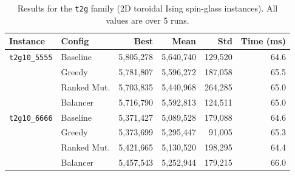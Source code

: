 \documentclass[12pt]{article}
\begin{document}
\begin{table}[H]
\centering
\begin{tabular}{|l|l|r|r|r|r|}
\toprule
\textbf{Instance} & \textbf{Config} & \textbf{Best} & \textbf{Mean} & \textbf{Std} & \textbf{Time (ms)} \\
\midrule
\texttt{t2g10\_5555} & \cellcolor{clrBaseline!25}Baseline  & \cellcolor{clrBaseline!25}5{,}805{,}278 & \cellcolor{clrBaseline!25}5{,}640{,}740 & \cellcolor{clrBaseline!25}129{,}520 & \cellcolor{clrBaseline!25}64.6 \\
                     & \cellcolor{clrGreedy!25}Greedy      & \cellcolor{clrGreedy!25}5{,}781{,}807   & \cellcolor{clrGreedy!25}5{,}596{,}272   & \cellcolor{clrGreedy!25}187{,}058   & \cellcolor{clrGreedy!25}65.5  \\
                     & \cellcolor{clrRanked!25}Ranked Mut. & \cellcolor{clrRanked!25}5{,}703{,}835   & \cellcolor{clrRanked!25}5{,}440{,}968   & \cellcolor{clrRanked!25}264{,}285   & \cellcolor{clrRanked!25}65.0  \\
                     & \cellcolor{clrBalancer!25}Balancer  & \cellcolor{clrBalancer!25}5{,}716{,}790 & \cellcolor{clrBalancer!25}5{,}592{,}813 & \cellcolor{clrBalancer!25}124{,}511 & \cellcolor{clrBalancer!25}65.0 \\
\midrule
\texttt{t2g10\_6666} & \cellcolor{clrBaseline!25}Baseline  & \cellcolor{clrBaseline!25}5{,}371{,}427 & \cellcolor{clrBaseline!25}5{,}089{,}528 & \cellcolor{clrBaseline!25}179{,}088 & \cellcolor{clrBaseline!25}64.6 \\
                     & \cellcolor{clrGreedy!25}Greedy      & \cellcolor{clrGreedy!25}5{,}373{,}699   & \cellcolor{clrGreedy!25}5{,}295{,}447   & \cellcolor{clrGreedy!25}91{,}005    & \cellcolor{clrGreedy!25}65.3  \\
                     & \cellcolor{clrRanked!25}Ranked Mut. & \cellcolor{clrRanked!25}5{,}421{,}665   & \cellcolor{clrRanked!25}5{,}130{,}520   & \cellcolor{clrRanked!25}198{,}295   & \cellcolor{clrRanked!25}64.4  \\
                     & \cellcolor{clrBalancer!25}Balancer  & \cellcolor{clrBalancer!25}5{,}457{,}543 & \cellcolor{clrBalancer!25}5{,}252{,}944 & \cellcolor{clrBalancer!25}179{,}215 & \cellcolor{clrBalancer!25}66.0 \\
\bottomrule
\end{tabular}
\caption{Results for the \texttt{t2g} family (2D toroidal Ising spin-glass instances).
         All values are over 5 runs.}
\label{tab:results-t2g}
\end{table}
\end{document}
